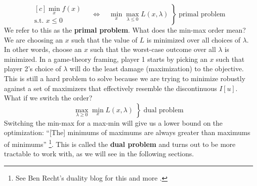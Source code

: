 \documentclass[11pt,a4paper,twoside]{scrartcl} %
\begin{document}
\[
\left.
\begin{gathered}[c]
    \min_x f(x) \\[4pt]
    \text{s.t. } x \leq 0
\end{gathered}
\quad\Longleftrightarrow\quad
\min_x \max_{\lambda \leq 0} L(x, \lambda)
\;\right\}\;\text{primal problem}
\]
We refer to this as the \textbf{primal problem}. What does the min-max order mean? We are choosing an $x$ such that the value of $L$ is minimized over all choices of $\lambda$. In other words, choose an $x$ such that the worst-case outcome over all $\lambda$ is minimized. In a game-theory framing, player 1 starts by picking an $x$ such that player 2's choice of $\lambda$ will do the least damage (maximization) to the objective. \\
\newline
This is still a hard problem to solve because we are trying to minimize robustly against a set of maximizers that effectively resemble the discontinuous $I[u]$. What if we switch the order?
\[
\left.
\max_{\lambda \geq 0} \min_x L(x, \lambda)
\;\right\}\;\text{dual problem}
\]
Switching the min-max for a max-min will give us a lower bound on the optimization: “[The] minimums of maximums are always greater than maximums of minimums” \footnote{ \footnotesize See Ben Recht's duality blog for this and more \cite{recht2024duality}.}. This is called the \textbf{dual problem} and turns out to be more tractable to work with, as we will see in the following sections. 
\end{document}
